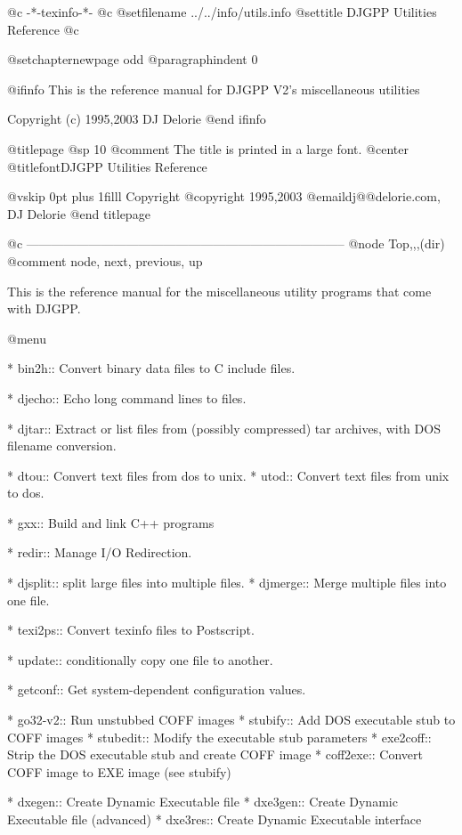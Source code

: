    @c -*-texinfo-*-
@c %
@setfilename ../../info/utils.info
@settitle DJGPP Utilities Reference
@c %

@setchapternewpage odd
@paragraphindent 0

@ifinfo
This is the reference manual for DJGPP V2's miscellaneous utilities

Copyright (c) 1995,2003 DJ Delorie
@end ifinfo

@titlepage
@sp 10
@comment The title is printed in a large font.
@center @titlefont{DJGPP Utilities Reference}

@vskip 0pt plus 1filll
Copyright @copyright{} 1995,2003 @email{dj@@delorie.com, DJ Delorie}
@end titlepage

@c -----------------------------------------------------------------------------
@node Top,,,(dir)
@comment node, next, previous, up

This is the reference manual for the miscellaneous utility programs that
come with DJGPP.

@menu

* bin2h::       Convert binary data files to C include files.

* djecho::      Echo long command lines to files.

* djtar::       Extract or list files from (possibly compressed)
                tar archives, with DOS filename conversion.

* dtou::        Convert text files from dos to unix.
* utod::        Convert text files from unix to dos.

* gxx::         Build and link C++ programs

* redir::       Manage I/O Redirection.

* djsplit::     split large files into multiple files.
* djmerge::     Merge multiple files into one file.

* texi2ps::     Convert texinfo files to Postscript.

* update::      conditionally copy one file to another.

* getconf::     Get system-dependent configuration values.

* go32-v2::     Run unstubbed COFF images
* stubify::     Add DOS executable stub to COFF images
* stubedit::    Modify the executable stub parameters
* exe2coff::    Strip the DOS executable stub and create COFF image
* coff2exe::    Convert COFF image to EXE image (see stubify)

* dxegen::      Create Dynamic Executable file
* dxe3gen::     Create Dynamic Executable file (advanced)
* dxe3res::     Create Dynamic Executable interface

